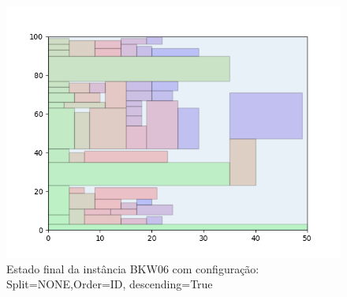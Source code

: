 \begin{figure}[H]
    \centering
    \caption[]{Estado final da instância BKW06 com configuração: Split=NONE,Order=ID, descending=True}
    \label{fig:bkw06-none-id-true}
    \includegraphics[scale=0.5]{output/figures/bkw/bkw06/none/id/true/00}
\end{figure}